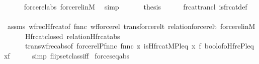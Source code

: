 \begin{isabellebody}
\ \ \ \ \isamarkupfalse%
\ forcerel{\isacharunderscore}{\kern0pt}abs\ forcerel{\isacharunderscore}{\kern0pt}in{\isacharunderscore}{\kern0pt}M\ \isamarkupfalse%
\ simp\isanewline
\ \ \isamarkupfalse%
\isanewline
\ \ \isamarkupfalse%
\ {\isacharquery}{\kern0pt}thesis\isanewline
\ \ \ \ \isamarkupfalse%
\ frc{\isacharunderscore}{\kern0pt}at{\isacharunderscore}{\kern0pt}trancl\ is{\isacharunderscore}{\kern0pt}frc{\isacharunderscore}{\kern0pt}at{\isacharunderscore}{\kern0pt}def\isanewline
\ \ \ \ \isamarkupfalse%
\ assms\ wfrec{\isacharunderscore}{\kern0pt}Hfrc{\isacharunderscore}{\kern0pt}at{\isacharbrackleft}{\kern0pt}of\ fnnc{\isacharbrackright}{\kern0pt}\ wf{\isacharunderscore}{\kern0pt}forcerel\ trans{\isacharunderscore}{\kern0pt}forcerel{\isacharunderscore}{\kern0pt}t\ relation{\isacharunderscore}{\kern0pt}forcerel{\isacharunderscore}{\kern0pt}t\ forcerel{\isacharunderscore}{\kern0pt}in{\isacharunderscore}{\kern0pt}M\isanewline
\ \ \ \ \ \ Hfrc{\isacharunderscore}{\kern0pt}at{\isacharunderscore}{\kern0pt}closed\ relation{}{\isacharunderscore}{\kern0pt}Hfrc{\isacharunderscore}{\kern0pt}at{\isacharunderscore}{\kern0pt}abs\isanewline
\ \ \ \ \ \ trans{\isacharunderscore}{\kern0pt}wfrec{\isacharunderscore}{\kern0pt}abs{\isacharbrackleft}{\kern0pt}of\ {\isachardoublequoteopen}forcerel{\isacharparenleft}{\kern0pt}P{\isacharcomma}{\kern0pt}fnnc{\isacharparenright}{\kern0pt}{\isachardoublequoteclose}\ fnnc\ z\ {\isachardoublequoteopen}is{\isacharunderscore}{\kern0pt}Hfrc{\isacharunderscore}{\kern0pt}at{\isacharparenleft}{\kern0pt}{\isacharhash}{\kern0pt}{\isacharhash}{\kern0pt}M{\isacharcomma}{\kern0pt}P{\isacharcomma}{\kern0pt}leq{\isacharparenright}{\kern0pt}{\isachardoublequoteclose}\ {\isachardoublequoteopen}{\isasymlambda}x\ f{\isachardot}{\kern0pt}\ bool{\isacharunderscore}{\kern0pt}of{\isacharunderscore}{\kern0pt}o{\isacharparenleft}{\kern0pt}Hfrc{\isacharparenleft}{\kern0pt}P{\isacharcomma}{\kern0pt}leq{\isacharcomma}{\kern0pt}x{\isacharcomma}{\kern0pt}f{\isacharparenright}{\kern0pt}{\isacharparenright}{\kern0pt}{\isachardoublequoteclose}{\isacharbrackright}{\kern0pt}\isanewline
\ \ \ \ \isamarkupfalse%
\ {\isacharparenleft}{\kern0pt}simp\ flip{\isacharcolon}{\kern0pt}setclass{\isacharunderscore}{\kern0pt}iff{\isacharparenright}{\kern0pt}\isanewline
{}\isamarkupfalse%
%
\endisatagproof
{\isafoldproof}%
%
\isadelimproof
\isanewline
%
\endisadelimproof
\isanewline
{}\isamarkupfalse%
\ forces{\isacharunderscore}{\kern0pt}eq{\isacharprime}{\kern0pt}{\isacharunderscore}{\kern0pt}abs\ {\isacharcolon}{\kern0pt}\isanewline

\end{isabellebody}
